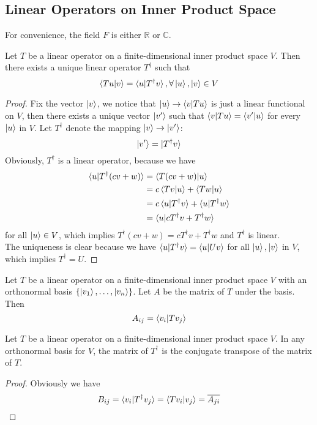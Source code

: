 \documentclass{article}
\begin{document}
\subsection{Linear Operators on Inner Product Space}
For convenience, the field $F$ is either $\mathbb{R}$ or $\mathbb{C}$.
\begin{thm}
	Let $T$ be a linear operator on a finite-dimensional inner product space $V$. Then there exists a unique linear operator $T^\dagger$ such that
	\[\braket{Tu|v}=\braket{u|T^\dagger v},\forall\ket{u},\ket{v}\in V\]
\end{thm}
\begin{proof}
	Fix the vector $\ket{v}$, we notice that $\ket{u}\rightarrow\braket{v|Tu}$ is just a linear functional on $V$, then there exists a unique vector $\ket{v'}$ such that $\braket{v|Tu}=\braket{v'|u}$ for every $\ket{u}$ in $V$. Let $T^\dagger$ denote the mapping $\ket{v}\rightarrow \ket{v'}$:
	\[\ket{v'}=\ket{T^\dagger v}\]
	Obviously, $T^\dagger$ is a linear operator, because we have
	\begin{align*}
		\braket{u|T^\dagger(cv+w)}&=\braket{T(cv+w)|u}\\
		&=c\braket{Tv|u}+\braket{Tw|u}\\
		&=c\braket{u|T^\dagger v}+\braket{u|T^\dagger w}\\
		&=\braket{u|cT^\dagger v+T^\dagger w}
	\end{align*}
	for all $\ket{u}\in V$, which implies $T^\dagger(cv+w)=cT^\dagger v+T^\dagger w$ and $T^\dagger$ is linear.\\
	The uniqueness is clear because we have $\braket{u|T^\dagger v}=\braket{u|Uv}$ for all $\ket{u},\ket{v}$ in $V$, which implies $T^\dagger=U$. 
\end{proof}
\begin{thm}
	Let $T$ be a linear operator on a finite-dimensional inner product space $V$ with an orthonormal basis $\{\ket{v_1},\dots,\ket{v_n}\}$. Let $A$ be the matrix of $T$ under the basis. Then
	\[A_{ij}=\braket{v_i|Tv_j}\]
\end{thm}
\begin{coro}
	Let $T$ be a linear operator on a finite-dimensional inner product space $V$. In any orthonormal basis for $V$, the matrix of $T^\dagger$ is the conjugate transpose of the matrix of $T$.
\end{coro}
\begin{proof}
	Obviously we have
	\[B_{ij}=\braket{v_i|T^\dagger v_j}=\braket{Tv_i|v_j}=\overline{A_{ji}}\]
\end{proof}
\end{document}
